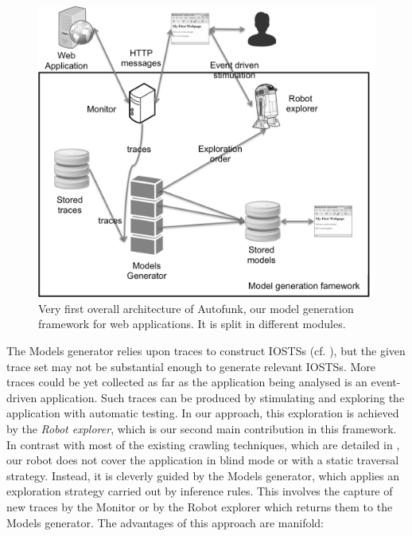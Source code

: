 \begin{figure}[ht]
    \begin{center}
        \includegraphics[width=0.8\linewidth]{figures/soict-framework.png}
    \end{center}

    \caption{Very first overall architecture of Autofunk, our
    model generation framework for web applications. It is split
    in different modules.}
    \label{fig:soict-framework}
\end{figure}

The Models generator relies upon traces to construct IOSTSs (cf.
), but the given
trace set may not be substantial enough to generate relevant
IOSTSs. More traces could be yet collected as far as the
application being analysed is an event-driven application.  Such
traces can be produced by stimulating and exploring the
application with automatic testing. In our approach, this
exploration is achieved by the \textit{Robot explorer}, which is
our second main contribution in this framework. In contrast with
most of the existing crawling techniques, which are detailed in
, our robot does not
cover the application in blind mode or with a static traversal
strategy.  Instead, it is cleverly guided by the Models
generator, which applies an exploration strategy carried out by
inference rules.  This involves the capture of new traces by the
Monitor or by the Robot explorer which returns them to the Models
generator. The advantages of this approach are manifold:

